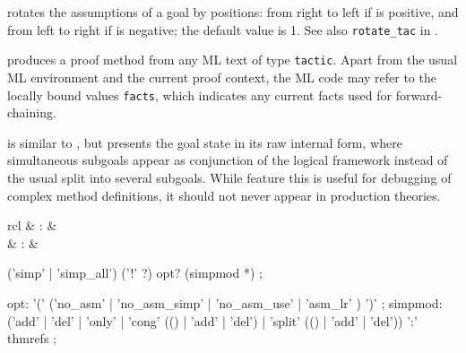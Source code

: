 \begin{isabellebody}
\begin{isamarkuptext}
\begin{descr}
  \item [\hyperlink{method.rotate-tac}{\mbox{\isa{rotate{\isacharunderscore}tac}}}~\isa{n}] rotates the assumptions of a
  goal by  positions: from right to left if  is
  positive, and from left to right if  is negative; the
  default value is 1.  See also \verb|rotate_tac| in
  \cite[\S3]{isabelle-ref}.

  \item [\hyperlink{method.tactic}{\mbox{\isa{tactic}}}~\isa{{\isachardoublequote}text{\isachardoublequote}}] produces a proof method from
  any ML text of type \verb|tactic|.  Apart from the usual ML
  environment and the current proof context, the ML code may refer to
  the locally bound values \verb|facts|, which indicates any
  current facts used for forward-chaining.

  \item [\hyperlink{method.raw-tactic}{\mbox{\isa{raw{\isacharunderscore}tactic}}}] is similar to \hyperlink{method.tactic}{\mbox{}}, but
  presents the goal state in its raw internal form, where simultaneous
  subgoals appear as conjunction of the logical framework instead of
  the usual split into several subgoals.  While feature this is useful
  for debugging of complex method definitions, it should not never
  appear in production theories.

  \end{descr}%
\end{isamarkuptext}%
\isamarkuptrue%
%
\isamarkuptrue%
%
\isamarkuptrue%
%
\begin{isamarkuptext}%
\begin{matharray}{rcl}
    \hypertarget{method.simp}{\hyperlink{method.simp}{\mbox{}}} & : & \isarmeth \\
    \hypertarget{method.simp-all}{\hyperlink{method.simp-all}{\mbox{}}} & : & \isarmeth \\
  \end{matharray}

  \begin{rail}
    ('simp' | 'simp\_all') ('!' ?) opt? (simpmod *)
    ;

    opt: '(' ('no\_asm' | 'no\_asm\_simp' | 'no\_asm\_use' | 'asm\_lr' ) ')'
    ;
    simpmod: ('add' | 'del' | 'only' | 'cong' (() | 'add' | 'del') |
      'split' (() | 'add' | 'del')) ':' thmrefs
    ;
  \end{rail}


\end{isamarkuptext}
\end{isabellebody}
